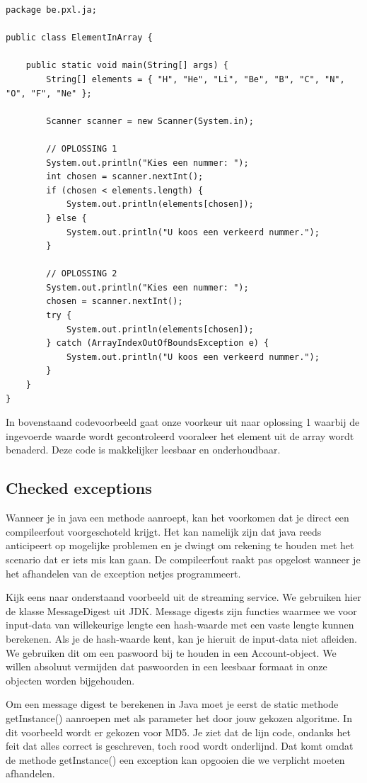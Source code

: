 \begin{lstlisting}
package be.pxl.ja;

public class ElementInArray {

	public static void main(String[] args) {
		String[] elements = { "H", "He", "Li", "Be", "B", "C", "N", "O", "F", "Ne" };

		Scanner scanner = new Scanner(System.in);
		
		// OPLOSSING 1
		System.out.println("Kies een nummer: ");
		int chosen = scanner.nextInt();
		if (chosen < elements.length) {
			System.out.println(elements[chosen]);
		} else {
			System.out.println("U koos een verkeerd nummer.");
		}

	    // OPLOSSING 2
		System.out.println("Kies een nummer: ");
		chosen = scanner.nextInt();
		try {
			System.out.println(elements[chosen]);
		} catch (ArrayIndexOutOfBoundsException e) {
			System.out.println("U koos een verkeerd nummer.");
		}
	}
}
\end{lstlisting}

In bovenstaand codevoorbeeld gaat onze voorkeur uit naar oplossing 1 waarbij de ingevoerde waarde wordt gecontroleerd vooraleer het element uit de array wordt benaderd. Deze code is makkelijker leesbaar en onderhoudbaar.


\subsection{Checked exceptions}

Wanneer je in java een methode aanroept, kan het voorkomen dat je direct een compileerfout voorgeschoteld krijgt. Het kan namelijk zijn dat java reeds anticipeert op mogelijke problemen en je dwingt om rekening te houden met het scenario dat er iets mis kan gaan. De compileerfout raakt pas opgelost wanneer je het afhandelen van de exception netjes programmeert.

Kijk eens naar onderstaand voorbeeld uit de streaming service.
We gebruiken hier de klasse MessageDigest uit JDK. Message digests zijn functies waarmee we voor input-data van willekeurige lengte een hash-waarde met een vaste lengte kunnen berekenen.  Als je de hash-waarde kent, kan je hieruit de input-data niet afleiden. We gebruiken dit om een paswoord bij te houden in een Account-object. We willen absoluut vermijden dat paswoorden in een leesbaar formaat in onze objecten worden bijgehouden.

Om een message digest te berekenen in Java moet je eerst de static methode getInstance() aanroepen met als parameter het door jouw gekozen algoritme. In dit voorbeeld wordt er gekozen voor MD5. Je ziet dat de lijn code, ondanks het feit dat alles correct is geschreven, toch rood wordt onderlijnd. Dat komt omdat de methode getInstance() een exception kan opgooien die we verplicht moeten afhandelen.

